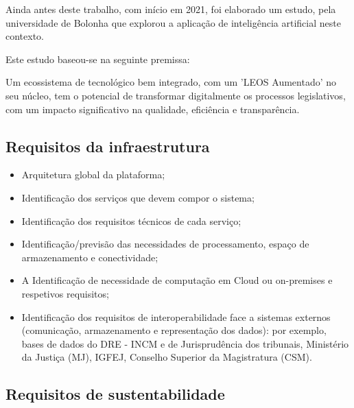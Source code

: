 Ainda antes deste trabalho, com início em 2021, foi elaborado um estudo, 
pela universidade de Bolonha que explorou a aplicação de inteligência artificial neste contexto.

Este estudo baseou-se na seguinte premissa:

\begin{quoting}
    Um ecossistema de tecnológico bem integrado, com um 'LEOS Aumentado' no seu núcleo, 
    tem o potencial de transformar digitalmente os processos legislativos, com um impacto 
    significativo na qualidade, eficiência e transparência.
\end{quoting}



\subsection{Requisitos da infraestrutura}

\begin{itemize}
\item Arquitetura global da plataforma;
\item Identificação dos serviços que devem compor o sistema;
\item Identificação dos requisitos técnicos de cada serviço;
\item Identificação/previsão das necessidades de processamento, espaço de armazenamento e
conectividade;
\item A Identificação de necessidade de computação em Cloud ou on-premises e respetivos
requisitos;
\item Identificação dos requisitos de interoperabilidade face a sistemas externos (comunicação,
armazenamento e representação dos dados): por exemplo, bases de dados do DRE - INCM e
de Jurisprudência dos tribunais, Ministério da Justiça (MJ), IGFEJ, 
Conselho Superior da Magistratura (CSM).
\end{itemize}


\subsection{Requisitos de sustentabilidade}



